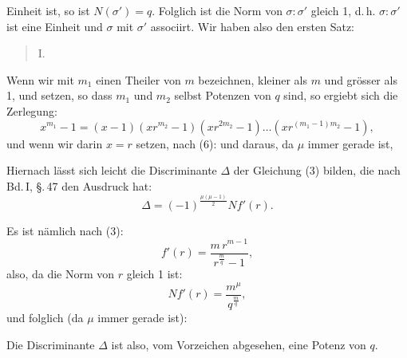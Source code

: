 Einheit ist, so ist $N(\sigma') = q$. Folglich ist die Norm von $\sigma : \sigma'$ gleich 1, d.\,h. $\sigma : \sigma'$ ist eine Einheit und $\sigma$ mit $\sigma'$ associirt. Wir haben also den ersten Satz:

\begin{quote}
I. 
\end{quote}

Wenn wir mit $m_1$ einen Theiler von $m$ bezeichnen, kleiner als $m$ und gr\"osser als 1, und
setzen, so dass $m_1$ und $m_2$ selbst Potenzen von $q$ sind, so ergiebt sich die Zerlegung:
\[
x^{m_1} - 1 = (x-1)(xr^{m_2}-1)(xr^{2m_2}-1)\ldots(xr^{(m_1-1)m_2}-1),
\]
und wenn wir darin $x = r$ setzen, nach (6):
und daraus, da $\mu$ immer gerade ist,

Hiernach l\"asst sich leicht die Discriminante $\Delta$ der Gleichung (3) bilden, die nach Bd.\,I, \S.\,47 den Ausdruck hat:
\[
\Delta = (-1)^{\frac{\mu(\mu-1)}{2}} N f'(r).
\]

Es ist n\"amlich nach (3):
\[
f'(r) = \dfrac{m\,r^{m-1}}{r^{\frac{m}{q}} - 1},
\]
also, da die Norm von $r$ gleich 1 ist:
\[
N f'(r) = \dfrac{m^{\mu}}{q^{\frac{m}{q}}},
\]
und folglich (da $\mu$ immer gerade ist):

Die Discriminante $\Delta$ ist also, vom Vorzeichen abgesehen, eine Potenz von $q$.
